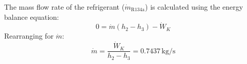 The mass flow rate of the refrigerant (\( \dot{m}_{\text{R134a}} \)) is calculated using the energy balance equation:  
\[
0 = \dot{m}(h_2 - h_3) - \dot{W}_K
\]
Rearranging for \( \dot{m} \):  
\[
\dot{m} = \frac{\dot{W}_K}{h_2 - h_3} = 0.7437 \, \text{kg/s}
\]